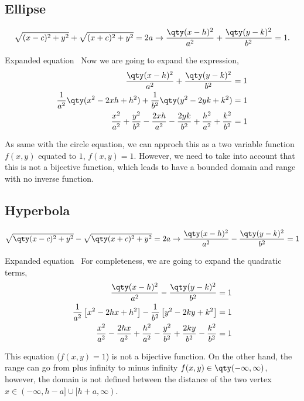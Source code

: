 \documentclass[../main-notes.tex]{subfile}
\begin{document}
\subsection{Ellipse}

\begin{gather*}
    \sqrt{(x-c)^2+y^2} + \sqrt{(x+c)^2+y^2} = 2a\to\frac{\qty(x-h)^2}{a^2} + \frac{\qty(y-k)^2}{b^2} = 1.
\end{gather*}

\begin{note}{Expanded equation}{~}
Now we are going to expand the expression,
\begin{align*}
    \frac{\qty(x-h)^2}{a^2} + \frac{\qty(y-k)^2}{b^2} &= 1 \\
    \frac{1}{a^2}\qty(x^2-2xh+h^2) + \frac{1}{b^2}\qty(y^2-2yk+k^2) &= 1 \\
    \frac{x^2}{a^2} + \frac{y^2}{b^2}
    -\frac{2xh}{a^2} -\frac{2yk}{b^2}
    +\frac{h^2}{a^2} + \frac{k^2}{b^2} &= 1
\end{align*}

As same with the circle equation, we can approch this as a two variable function $f(x,y)$ equated to $1$, $f(x,y)=1$.
However, we need to take into account that this is not a bijective function, which leads to have a bounded domain and range with no inverse function.
\end{note}

\subsection{Hyperbola}

\begin{gather*}
    \sqrt{\qty(x-c)^2+y^2} - \sqrt{\qty(x+c)^2+y^2} = 2a\to\frac{\qty(x-h)^2}{a^2} - \frac{\qty(y-k)^2}{b^2} = 1
\end{gather*}

\begin{note}{Expanded equation}{~}
    For completeness, we are going to expand the quadratic terms,
    \begin{align*}
        \frac{\qty(x-h)^2}{a^2} - \frac{\qty(y-k)^2}{b^2} &= 1 \\
        \frac{1}{a^2}\left[x^2-2hx+h^2\right] -\frac{1}{b^2}\left[y^2-2ky+k^2\right] &= 1 \\
        \frac{x^2}{a^2}-\frac{2hx}{a^2}+\frac{h^2}{a^2}  -\frac{y^2}{b^2}+\frac{2ky}{b^2}-\frac{k^2}{b^2} &= 1
    \end{align*}

    This equation ($f(x,y)=1$) is not a bijective function.
    On the other hand, the range can go from plus infinity to minus infinity $f(x,y)\in\qty(-\infty,\infty)$, however, the domain is not defined between the distance of the two vertex $x\in(-\infty,h-a]\cup[h+a,\infty)$.
\end{note}
\end{document}

